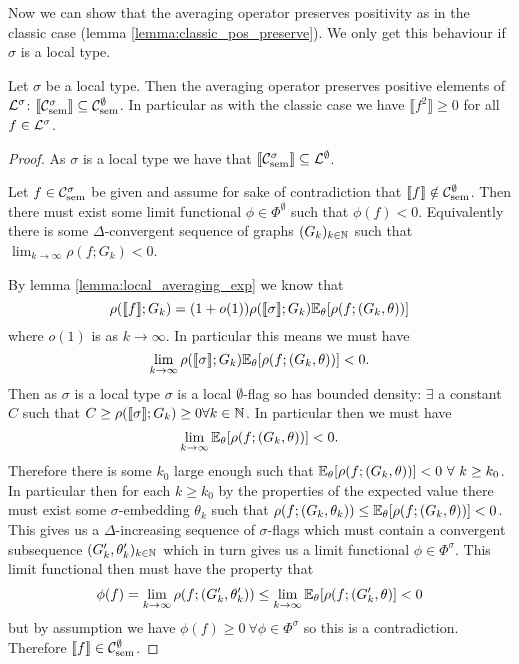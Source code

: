 Now we can show that the averaging operator preserves positivity as in the
classic case (lemma \ref{lemma:classic_pos_preserve}). We only get this
behaviour if $\sigma$ is a local type.

\begin{lemma}
    \label{lemma:local_pos_preserve}
    Let $\sigma$ be a local type. Then the averaging operator preserves positive
    elements of $\mathcal{L}^\sigma$:
    $\llbracket \mathcal{C}_\mathrm{sem}^\sigma \rrbracket \subseteq  \mathcal{C}_\mathrm{sem}^\emptyset$.
    In particular as with the classic case we have $\llbracket f^2 \rrbracket \geq 0$
    for all $f\in\mathcal{L}^\sigma$.
\end{lemma}

\begin{proof}
    As $\sigma$ is a local type we have that
    $\llbracket \mathcal{C}_\mathrm{sem}^\sigma \rrbracket \subseteq \mathcal{L}^\emptyset$.

    Let $f\in\mathcal{C}_\mathrm{sem}^\sigma$ be given and assume for sake of contradiction that
    $\llbracket f \rrbracket \notin\mathcal{C}_\mathrm{sem}^\emptyset$. Then there must exist
    some limit functional $\phi\in\Phi^\emptyset$ such that $\phi(f)<0$. Equivalently
    there is some $\Delta$-convergent sequence of graphs $(G_k)_{k\in\mathbb{N}}$
    such that $\lim_{k\to\infty}\rho(f; G_k) < 0$.

    By lemma \ref{lemma:local_averaging_exp} we know that
    \[
        \rho(\llbracket f\rrbracket; G_k) = (1+o(1)) \rho(\llbracket \sigma \rrbracket; G_k)
        \mathbb{E}_\theta[\rho(f; (G_k,\theta))]
    \]
    where $o(1)$ is as $k \to \infty$.
    In particular this means we must have
    \[
        \lim_{k\to\infty} \rho(\llbracket \sigma \rrbracket; G_k)
        \mathbb{E}_\theta[\rho(f; (G_k,\theta))] < 0.
    \]
    Then as $\sigma$ is a local type $\sigma$ is a local $\emptyset$-flag so has bounded
    density: $\exists$ a constant $C$ such that $C \geq \rho(\llbracket\sigma\rrbracket; G_k) \geq
    0\forall k\in\mathbb{N}$. In particular then we must have
    \[
        \lim_{k\to\infty} \mathbb{E}_\theta[\rho(f; (G_k,\theta))] < 0.
    \]
    Therefore there is some $k_0$ large enough such that
    $\mathbb{E}_\theta[\rho(f; (G_k, \theta))] < 0\ \forall\ k \geq k_0$. In particular then
    for each $k \geq k_0$ by the properties of the expected value there must exist
    some $\sigma$-embedding $\theta_k$ such that
    $\rho(f; (G_k, \theta_k)) \leq \mathbb{E}_\theta[\rho(f; (G_k,\theta))] < 0$. This gives
    us a $\Delta$-increasing sequence of $\sigma$-flags which must contain a convergent
    subsequence $(G'_k, \theta'_k)_{k\in\mathbb{N}}$
    which in turn gives us a limit functional $\phi\in\Phi^\sigma$. This limit functional
    then must have the property that
    \[
        \phi(f) = \lim_{k\to\infty}\rho(f; (G'_k, \theta'_k))
        \leq \lim_{k\to\infty} \mathbb{E}_\theta[\rho(f; (G'_k, \theta)] < 0
    \]
    but by assumption we have $\phi(f) \geq 0\ \forall \phi\in\Phi^\sigma$ so this is
    a contradiction. Therefore $\llbracket f \rrbracket \in\mathcal{C}_\mathrm{sem}^\emptyset$.
\end{proof}

